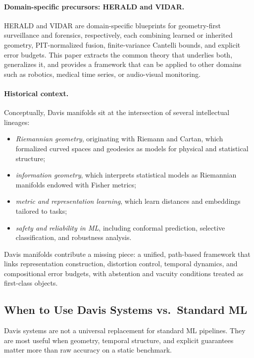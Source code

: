 \documentclass[11pt]{article}
\theoremstyle{remark}
\theoremstyle{plain}
\begin{document}
\paragraph{Domain-specific precursors: HERALD and VIDAR.}
HERALD and VIDAR are domain-specific blueprints for geometry-first surveillance and forensics, respectively, each combining learned or inherited geometry, PIT-normalized fusion, finite-variance Cantelli bounds, and explicit error budgets.  This paper extracts the common theory that underlies both, generalizes it, and provides a framework that can be applied to other domains such as robotics, medical time series, or audio-visual monitoring.

\paragraph{Historical context.}
Conceptually, Davis manifolds sit at the intersection of several intellectual lineages:
\begin{itemize}[leftmargin=*]
    \item \emph{Riemannian geometry}, originating with Riemann and Cartan, which formalized curved spaces and geodesics as models for physical and statistical structure;
    \item \emph{information geometry}, which interprets statistical models as Riemannian manifolds endowed with Fisher metrics;
    \item \emph{metric and representation learning}, which learn distances and embeddings tailored to tasks;
    \item \emph{safety and reliability in ML}, including conformal prediction, selective classification, and robustness analysis.
\end{itemize}
Davis manifolds contribute a missing piece: a unified, path-based framework that links representation construction, distortion control, temporal dynamics, and compositional error budgets, with abstention and vacuity conditions treated as first-class objects.

\subsection{When to Use Davis Systems vs.\ Standard ML}
\label{sec:when-to-use}

Davis systems are not a universal replacement for standard ML pipelines. They are most useful when geometry, temporal structure, and explicit guarantees matter more than raw accuracy on a static benchmark.
\end{document}

